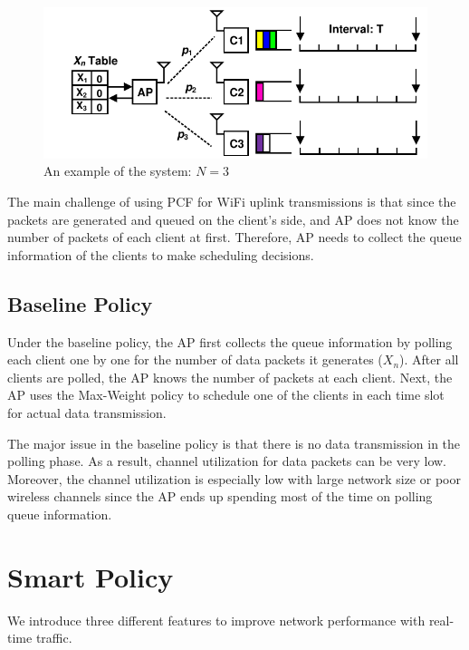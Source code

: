 \documentclass{article}
\begin{document}
\begin{figure}[htbp]
   \centering
   \includegraphics[width=\textwidth]{../presentation/network.pdf}
   \caption{An example of the system: $N=3$}
   \label{fig:network}
\end{figure}

The main challenge of using PCF for WiFi uplink transmissions is that since the packets are generated and queued on the client's side, and AP does not know the number of packets of each client at first. Therefore, AP needs to collect the queue information of the clients to make scheduling decisions.

\subsection{Baseline Policy}
Under the baseline policy, the AP first collects the queue information by polling each client one by one for the number of data packets it generates ($X_n$). After all clients are polled, the AP knows the number of packets at each client. Next, the AP uses the Max-Weight policy to schedule one of the clients in each time slot for actual data transmission. 

The major issue in the baseline policy is that there is no data transmission in the polling phase. As a result, channel utilization for data packets can be very low. Moreover, the channel utilization is especially low with large network size or poor wireless channels since the AP ends up spending most of the time on polling queue information.

\section{Smart Policy}

We introduce three different features to improve network performance with real-time traffic.
\end{document}
